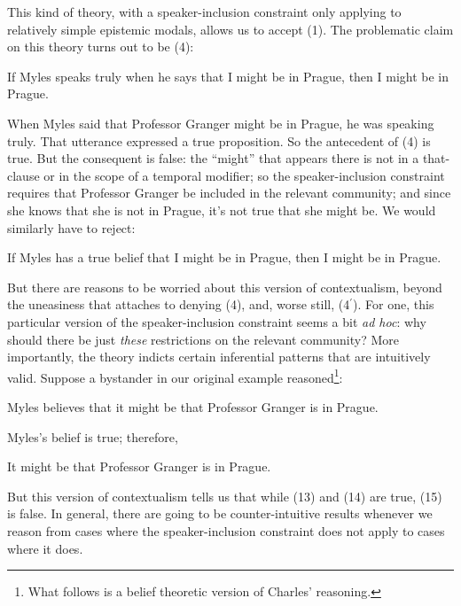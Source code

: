 \documentclass[
  11pt,
  letterpaper,
  DIV=11,
  numbers=noendperiod]{scrartcl}
\providecommand{\tightlist}{%
  \setlength{\itemsep}{0pt}\setlength{\parskip}{0pt}}\usepackage{longtable,booktabs,array}
\begin{document}
This kind of theory, with a speaker-inclusion constraint only applying
to relatively simple epistemic modals, allows us to accept (1). The
problematic claim on this theory turns out to be (4):

\begin{description}
\tightlist
\item[(4)]
If Myles speaks truly when he says that I might be in Prague, then I
might be in Prague.
\end{description}

When Myles said that Professor Granger might be in Prague, he was
speaking truly. That utterance expressed a true proposition. So the
antecedent of (4) is true. But the consequent is false: the ``might''
that appears there is not in a that-clause or in the scope of a temporal
modifier; so the speaker-inclusion constraint requires that Professor
Granger be included in the relevant community; and since she knows that
she is not in Prague, it's not true that she might be. We would
similarly have to reject:

\begin{description}
\tightlist
\item[(4\(^\prime\))]
If Myles has a true belief that I might be in Prague, then I might be in
Prague.
\end{description}

But there are reasons to be worried about this version of contextualism,
beyond the uneasiness that attaches to denying (4), and, worse still,
(4\(^\prime\)). For one, this particular version of the
speaker-inclusion constraint seems a bit \emph{ad hoc}: why should there
be just \emph{these} restrictions on the relevant community? More
importantly, the theory indicts certain inferential patterns that are
intuitively valid. Suppose a bystander in our original example
reasoned\footnote{What follows is a belief theoretic version of Charles'
  reasoning.}:

\begin{description}
\tightlist
\item[(13)]
Myles believes that it might be that Professor Granger is in Prague.
\item[(14)]
Myles's belief is true; therefore,
\item[(15)]
It might be that Professor Granger is in Prague.
\end{description}

But this version of contextualism tells us that while (13) and (14) are
true, (15) is false. In general, there are going to be counter-intuitive
results whenever we reason from cases where the speaker-inclusion
constraint does not apply to cases where it does.
\end{document}
